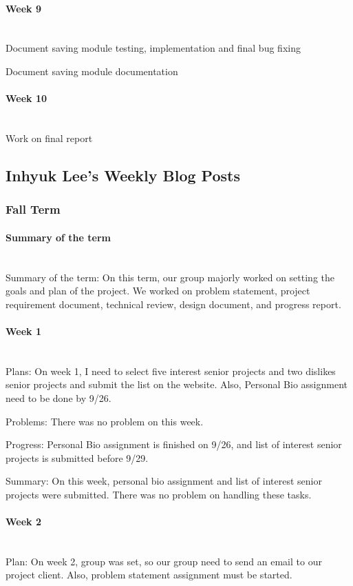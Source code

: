 \documentclass[article, onecolumn, draftclsnofoot,10pt, compsoc]{IEEEtran}
\begin{document}
\paragraph{Week 9}
\mbox{}\\
Document saving module testing, implementation and final bug fixing

Document saving module documentation

\paragraph{Week 10}
\mbox{}\\
Work on final report

\subsection{Inhyuk Lee's Weekly Blog Posts}
\subsubsection{Fall Term}
\paragraph{Summary of the term}
\mbox{}\\
Summary of the term: On this term, our group majorly worked on setting the goals and plan of the project. We worked on problem statement, project requirement document, technical review, design document, and progress report.

\paragraph{Week 1}
\mbox{}\\
Plans: On week 1, I need to select five interest senior projects and two dislikes senior projects and submit the list on the website. Also, Personal Bio assignment need to be done by 9/26.

Problems: There was no problem on this week.

Progress: Personal Bio assignment is finished on 9/26, and list of interest senior projects is submitted before 9/29.

Summary: On this week, personal bio assignment and list of interest senior projects were submitted. There was no problem on handling these tasks.

\paragraph{Week 2}
\mbox{}\\
Plan: On week 2, group was set, so our group need to send an email to our project client. Also, problem statement assignment must be started.
\end{document}
